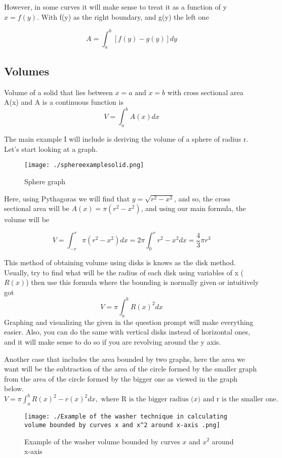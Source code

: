 \documentclass{article}
\begin{document}
	However, in some curves it will make sense to treat it as a function of y $ x = f(y) $. With f(y) as the right boundary, and g(y) the left one

	\[
		A = \int^{b}_{a} [f(y)-g(y)] dy  
	\]
	

	\subsection{Volumes}

Volume of a solid that lies between $ x=a \text{ and } x=b $ with cross sectional area A(x) and A is a continuous function is
\[
	V = \int^{b}_{a} A(x) dx  
\]

The main example I will include is deriving the volume of a sphere of radius r. Let's start looking at a graph. 
\begin{figure}[h!]
\centering
\texttt{[image: ./sphereexamplesolid.png]}
\caption{Sphere graph}
\label{fig:-sphereexamplesolid-png}
\end{figure}

Here, using Pythagoras we will find that $ y = \sqrt{r^2-x^2} $, and so, the cross sectional area will be $ A(x) = \pi (r^2-x^2) $, and using our main formula, the volume will be

\[
	V = \int^{r}_{-r} \pi(r^2-x^2) dx  = 2\pi \int^{r}_{0} r^2-x^2 dx = \frac{4}{3} \pi r^3 
\]

This method of obtaining volume using disks is knows as the disk method. Usually, try to find what will be the radius of each disk using variables of x ($R(x)$) then use this formula where the bounding is normally given or intuitively got
\[
	V = \pi \int^{b}_{a} R(x)^2 dx  
\]
	Graphing and visualizing the given in the question prompt will make everything easier. Also, you can do the same with vertical disks instead of horizontal ones, and it will make sense to do so if you are revolving around the y axis. 


	Another case that includes the area bounded by two graphs, here the area we want will be the subtraction of the area of the circle formed by the smaller graph from the area of the circle formed by the bigger one as viewed in the graph below. 	$V = \pi \int^{b}_{a} R(x)^2 - r(x)^2 dx, \text{ where R is the bigger radius ($x$) and r is the smaller one.}$


	\begin{figure}[h!]
	\centering
	\texttt{[image: ./Example of the washer technique in calculating volume bounded by curves x and x^2 around x-axis .png]}
	\caption{Example of the washer volume bounded by curves $x$ and $x^2$ around x-axis}
	\label{fig:-Example-of-the-washer-technique-in-calculating-volume-bounded-by-curves-x-and-x-2-around-x-axis-png}
	\end{figure}
\end{document}
